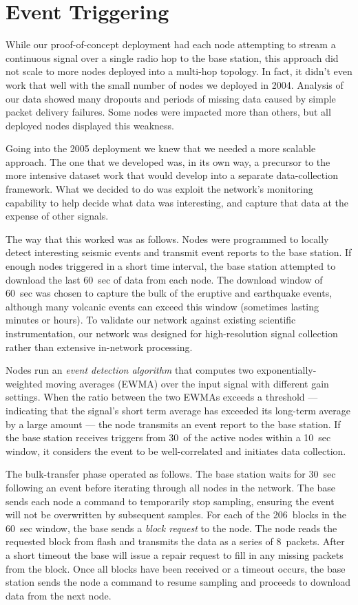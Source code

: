 \section{Event Triggering}
\label{sec-eventtriggering}
\label{subsec-eventdriven}

While our proof-of-concept deployment had each node attempting to stream a
continuous signal over a single radio hop to the base station, this approach
did not scale to more nodes deployed into a multi-hop topology.  In fact, it
didn't even work that well with the small number of nodes we deployed in
2004. Analysis of our data showed many dropouts and periods of missing data
caused by simple packet delivery failures. Some nodes were impacted more than
others, but all deployed nodes displayed this weakness.

Going into the 2005 deployment we knew that we needed a more scalable
approach. The one that we developed was, in its own way, a precursor to the
more intensive dataset work that would develop into a separate
data-collection framework.  What we decided to do was exploit the network's
monitoring capability to help decide what data was interesting, and capture
that data at the expense of other signals.

The way that this worked was as follows.  Nodes were programmed to locally
detect interesting seismic events and transmit event reports to the base
station. If enough nodes triggered in a short time interval, the base station
attempted to download the last 60~sec of data from each node.  The download
window of 60~sec was chosen to capture the bulk of the eruptive and
earthquake events, although many volcanic events can exceed this window
(sometimes lasting minutes or hours).  To validate our network against
existing scientific instrumentation, our network was designed for
high-resolution signal collection rather than extensive in-network
processing.

Nodes run an {\em event detection algorithm} that computes two
exponentially-weighted moving averages (EWMA) over the input signal with
different gain settings. When the ratio between the two EWMAs exceeds a
threshold --- indicating that the signal's short term average has exceeded
its long-term average by a large amount --- the node transmits an event
report to the base station.  If the base station receives triggers from 30\
of the active nodes within a 10~sec window, it considers the event to be
well-correlated and initiates data collection.

The bulk-transfer phase operated as follows.  The base station waits for
30~sec following an event before iterating through all nodes in the network.
The base sends each node a command to temporarily stop sampling, ensuring the
event will not be overwritten by subsequent samples.  For each of the
206~blocks in the 60~sec window, the base sends a {\em block request} to the
node.  The node reads the requested block from flash and transmits the data
as a series of 8~packets.  After a short timeout the base will issue a repair
request to fill in any missing packets from the block.  Once all blocks have
been received or a timeout occurs, the base station sends the node a command
to resume sampling and proceeds to download data from the next node. 

